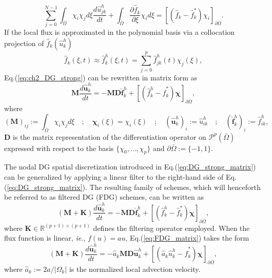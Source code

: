 \documentclass[preprint,12pt]{elsarticle}
\begin{document}
\begin{equation}
    \sum_{j=0}^{N-1}\int_{\bar{\Omega}} \chi_i \chi_j d \xi \frac{d \hat{u}^h_{jk}}{dt}
   +\int_{\bar{\Omega}} \frac{\partial\hat{f}_k}{\partial \xi} \chi_i d\xi = \left[(\hat{f}_k - \hat{f}_k^{*})\chi_i\right]_{\partial \bar{\Omega}}. \label{eq:ch2_DG_strong}
\end{equation}
If the local flux is approximated in the polynomial basis via a collocation projection of $\hat{f}_k(\hat{u}^h_k)$
\begin{equation}
    \hat{f}_k(\xi,t) \approx
    \hat{f}_k^h(\xi,t)=
    \sum_{j=0}^{p} \hat{f}_{jk}^h(t) \chi_j(\xi),
\end{equation}
Eq.(\ref{eq:ch2_DG_strong}) can be rewritten in matrix form as
\begin{equation}
    \mathbf{M} \frac{d\hat{\mathbf{u}}_k^h}{dt}
    = -\mathbf{M} \mathbf{D} \hat{\mathbf{f}}_k^h
    + \left[(\hat{f}_k^h - \hat{f}_k^{*})\bm{\chi}\right]_{\partial \bar{\Omega}},
    \label{eq:DG_strong_matrix}
\end{equation}
where
\begin{equation}
    (\mathbf{M})_{ij} := \int_{\bar{\Omega}} \chi_i \chi_j d \xi
    \quad ; \quad
    \bm{\chi}_i(\xi) = \chi_i(\xi)
    \quad ; \quad
    (\hat{\mathbf{u}}_k^h)_{i} := \hat{u}_{ik}^h
    \quad ; \quad
    (\hat{\mathbf{f}}_k^h)_{i} := \hat{f}_{ik}^h,
    \label{eq:ch2_DG_operators}
\end{equation}
$\mathbf{D}$ is the matrix representation of the differentiation operator on $\mathcal{P}^{p}(\bar{\Omega})$ expressed with respect to the basis $\{\chi_0, \dots, \chi_p\}$ and $\partial \bar{\Omega} := \{-1,1\}$.

The nodal DG spatial discretization introduced in Eq.(\ref{eq:DG_strong_matrix}) can be generalized by applying a linear filter to the right-hand side of Eq.(\ref{eq:DG_strong_matrix}). The resulting family of schemes, which will henceforth be referred to as filtered DG (FDG) schemes, can be written as
\begin{equation}
    (\mathbf{M}+\mathbf{K}) \frac{d\hat{\mathbf{u}}_k^h}{dt}
    = -\mathbf{M} \mathbf{D} \hat{\mathbf{f}}_k^h
    + \left[(\hat{f}_k^h - \hat{f}_k^{*})\bm{\chi}\right]_{\partial \bar{\Omega}},
    \label{eq:FDG_matrix}
\end{equation}
where $\mathbf{K} \in \mathbb{R}^{(p+1) \times (p+1)}$ defines the filtering operator employed. When the flux function is linear, \textit{ie.}, $f(u)=au$, Eq.(\ref{eq:FDG_matrix}) takes the form
\begin{equation}
    (\mathbf{M}+\mathbf{K}) \frac{d\hat{\mathbf{u}}_k^h}{dt}
    = -\hat{a}_k\mathbf{M} \mathbf{D} \hat{\mathbf{u}}_k^h
    + \left[(\hat{a}_k\hat{u}^h_k - \hat{f}_k^{*})\bm{\chi}\right]_{\partial \bar{\Omega}},
    \label{eq:FDG_matrix_linear}
\end{equation}
where $\hat{a}_k := 2a / |\Omega_k|$ is the normalized local advection velocity.
\end{document}
